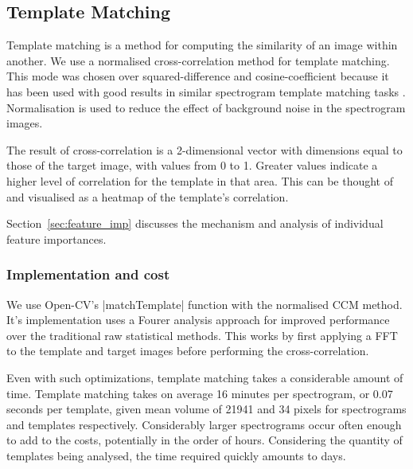\subsection{Template Matching}
Template matching is a method for computing the similarity of an image within
another.
We use a normalised cross-correlation method for template matching.
This mode was chosen over squared-difference and cosine-coefficient because it
has been used with good results in similar spectrogram template matching tasks
\parencite{lasseck2013}.
Normalisation is used to reduce the effect of background noise in the
spectrogram images.

The result of cross-correlation is a 2-dimensional vector with dimensions equal to
those of the target image, with values from 0 to 1. %
Greater values indicate a higher level of correlation for the template in that
area.
This can be thought of and visualised as a heatmap of the template's correlation.


Section~\ref{sec:feature_imp} discusses the mechanism and analysis of individual
feature importances.

\subsubsection{Implementation and cost}
We use Open-CV's |matchTemplate| function with the normalised CCM method.
It's implementation uses a Fourer analysis approach for improved performance over
the traditional raw statistical methods.
This works by first applying a FFT to the template and target images before
performing the cross-correlation.

Even with such optimizations, template matching takes a considerable amount of
time.
Template matching takes on average 16 minutes per spectrogram, or 0.07 seconds
per template,
given mean volume of 21941 and 34 pixels for spectrograms and templates respectively.
Considerably larger spectrograms occur often enough to add to the costs,
potentially in the order of hours.
Considering the quantity of templates being analysed, the time required quickly
amounts to days.

